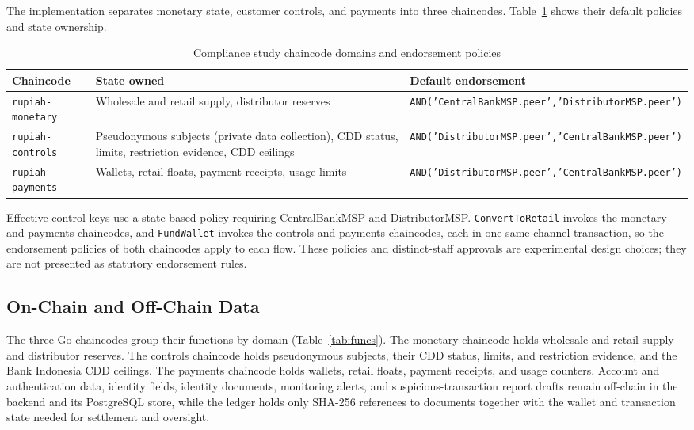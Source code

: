 \documentclass[conference]{IEEEtran}
\begin{document}
The implementation separates monetary state, customer controls, and payments
into three chaincodes. Table~\ref{tab:study-chaincodes} shows their default
policies and state ownership.

\begin{table}[!t]
\caption{Compliance study chaincode domains and endorsement policies}
\label{tab:study-chaincodes}
\centering
\scriptsize
\begin{tabular}{@{}p{2.8cm}p{5.1cm}p{8.8cm}@{}}
\toprule
\textbf{Chaincode} & \textbf{State owned} & \textbf{Default endorsement} \\
\midrule
\texttt{rupiah-monetary} & Wholesale and retail supply, distributor reserves & \texttt{AND('CentralBankMSP.peer','DistributorMSP.peer')} \\
\texttt{rupiah-controls} & Pseudonymous subjects (private data collection), CDD status, limits, restriction evidence, CDD ceilings & \texttt{AND('DistributorMSP.peer','CentralBankMSP.peer')} \\
\texttt{rupiah-payments} & Wallets, retail floats, payment receipts, usage limits & \texttt{AND('DistributorMSP.peer','CentralBankMSP.peer')} \\
\bottomrule
\end{tabular}
\end{table}

Effective-control keys use a state-based policy requiring CentralBankMSP and
DistributorMSP. \texttt{ConvertToRetail} invokes the monetary and payments chaincodes, and
\texttt{FundWallet} invokes the controls and payments chaincodes, each in one
same-channel transaction, so the endorsement policies of both chaincodes apply to
each flow.
These policies and distinct-staff approvals are experimental design choices;
they are not presented as statutory endorsement rules.

\subsection{On-Chain and Off-Chain Data}
The three Go chaincodes group their functions by domain (Table~\ref{tab:funcs}).
The monetary chaincode holds wholesale and retail supply and distributor reserves. The
controls chaincode holds pseudonymous subjects, their CDD status, limits, and
restriction evidence, and the Bank Indonesia CDD ceilings. The payments chaincode holds wallets,
retail floats, payment receipts, and usage counters. Account and authentication data,
identity fields, identity documents, monitoring alerts, and suspicious-transaction
report drafts remain off-chain in the backend and its PostgreSQL store, while the
ledger holds only SHA-256 references to documents together with the wallet and
transaction state needed for settlement and oversight.
\end{document}
